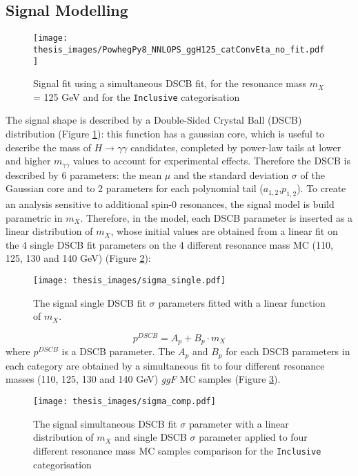 \documentclass[a4paper, oneside, 11pt, openright]{book}
\begin{document}
 			\subsection{Signal Modelling}
 				\begin{figure}
 					\centering
 					\texttt{[image: thesis\_images/PowhegPy8\_NNLOPS\_ggH125\_catConvEta\_no\_fit.pdf]}
 					\caption{Signal fit using a simultaneous DSCB fit, for the resonance mass $m_X$ = 125 GeV and for the \texttt{Inclusive} categorisation}
 					\label{fig:sig_fit}
 				\end{figure}
 				The signal shape is described by a Double-Sided Crystal Ball (DSCB) distribution (Figure \ref{fig:sig_fit}): this function has a gaussian core, which is useful to describe the mass of $H\to\gamma\gamma$ candidates, completed by power-law tails at lower and higher $m_{\gamma\gamma}$ values to account for experimental effects. Therefore the DSCB is described by 6 parameters: the mean $\mu$ and the standard deviation $\sigma$ of the Gaussian core and to 2 parameters for each polynomial tail ($a_{1,2}$,$p_{1,2}$). To create an analysis sensitive to additional spin-0 resonances, the signal model is build parametric in $m_X$. Therefore, in the model, each DSCB parameter is inserted as a linear distribution of $m_X$, whose initial values are obtained from a linear fit on the 4 single DSCB fit parameters on the 4 different resonance mass MC (110, 125, 130 and 140 GeV)  (Figure \ref{fig:sigma_single}):
 				\begin{figure}
 					\centering
 					\texttt{[image: thesis\_images/sigma\_single.pdf]}
 					\caption{The signal single DSCB fit $\sigma$ parameters fitted with a linear function of $m_X$.}
 					\label{fig:sigma_single}
 				\end{figure}
 				\begin{equation}\label{eq:DSCB_par}
 					p^{DSCB} = A_p + B_p\cdot m_X
 				\end{equation}
 				where $p^{DSCB}$ is a DSCB parameter. The $A_p$ and $B_p$ for each DSCB parameters in each category are obtained by a simultaneous fit to four different resonance masses (110, 125, 130 and 140 GeV) \textit{ggF} MC samples (Figure \ref{fig:sigma_fit}).
 				\begin{figure}
 					\centering
 					\texttt{[image: thesis\_images/sigma\_comp.pdf]}
 					\caption{The signal simultaneous DSCB fit $\sigma$ parameter with a linear distribution of $m_X$ and single DSCB $\sigma$ parameter applied to four different resonance mass MC samples comparison for the \texttt{Inclusive} categorisation}
 					\label{fig:sigma_fit}
 				\end{figure}
 				
\end{document}

